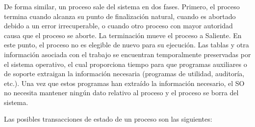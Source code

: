 \documentclass{article}
\begin{document}
				De forma similar, un proceso sale del sistema en dos fases. Primero, el proceso termina cuando alcanza su punto de finalización natural, cuando es abortado debido a un error irrecuperable, o cuando otro proceso con mayor autoridad causa que el proceso se aborte. La terminación mueve el proceso a Saliente. En este punto, el proceso no es elegible de nuevo para su ejecución. Las tablas y otra información asociada con el trabajo se encuentran temporalmente preservadas por el sistema operativo, el cual proporciona tiempo para que programas auxiliares o de soporte extraigan la información necesaria (programas de utilidad, auditoría, etc.). Una vez que estos programas han extraído la información necesario, el SO no necesita mantener ningún dato relativo al proceso y el proceso se borra del sistema.
				
				Las posibles transacciones de estado de un proceso son las siguientes:
				
\end{document}
